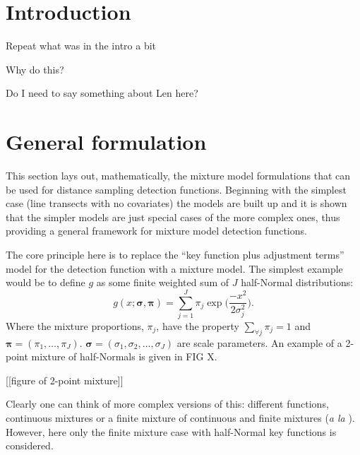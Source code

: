 \section{Introduction}

Repeat what was in the intro a bit

Why do this?


Do I need to say something about Len here?


\section{General formulation}

This section lays out, mathematically, the mixture model formulations that can be used for distance sampling detection functions. Beginning with the simplest case (line transects with no covariates) the models are built up and it is shown that the simpler models are just special cases of the more complex ones, thus providing a general framework for mixture model detection functions.

The core principle here is to replace the ``key function plus adjustment terms'' model for the detection function with a mixture model. The simplest example would be to define $g$ as some finite weighted sum of $J$ half-Normal distributions:
\begin{equation}
g(x;\bm{\sigma},\bm{\pi}) = \sum_{j=1}^J \pi_j \exp \Big( \frac{-x^2}{2 \sigma_j^2}\Big).
\label{mmds-simplemix}
\end{equation}
Where the mixture proportions, $\pi_j$, have the property $\sum_{\forall j}\pi_j=1$ and $\bm{\pi} = (\pi_1, \dots, \pi_J)$. $\bm{\sigma}=(\sigma_1,\sigma_2,\dots,\sigma_J)$ are scale parameters. An example of a 2-point mixture of half-Normals is given in FIG X.

[[figure of 2-point mixture]]

Clearly one can think of more complex versions of this: different functions, continuous mixtures or a finite mixture of continuous and finite mixtures (\textit{a la} \cite{morgan08}). However, here only the finite mixture case with half-Normal key functions is considered.

